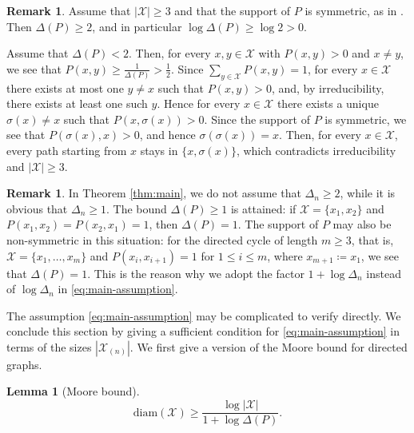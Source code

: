 \documentclass[a4paper, reqno, 11pt]{amsart}
\newtheorem{Lem}[Thm]{Lemma}
\theoremstyle{definition}
\newtheorem{Rem}[Thm]{Remark}
\begin{document}
\begin{Rem}\label{rem:delta-symmetric}
Assume that $|\mathcal{X}| \ge 3$ and that the support of $P$ is symmetric, as in \cite{Salez2024}.
Then $\Delta(P) \ge 2$, and in particular $\log \Delta(P) \ge \log 2 > 0$.


Assume that $\Delta(P) < 2$.
Then, for every $x, y \in \mathcal{X}$ with $P(x,y) > 0$ and $x \ne y$,
we see that $P(x,y) \ge \frac{1}{\Delta(P)} > \frac{1}{2}$.
Since $\sum_{y \in \mathcal{X}} P(x,y) = 1$,
for every $x \in \mathcal{X}$ there exists at most one $y \ne x$ such that $P(x,y) > 0$,
and, by irreducibility, there exists at least one such $y$.
Hence for every $x \in \mathcal{X}$ there exists a unique $\sigma(x) \ne x$ such that $P(x, \sigma(x)) > 0$.
Since the support of $P$ is symmetric, we see that $P(\sigma(x), x) > 0$, and hence $\sigma(\sigma(x)) = x$.
Then, for every $x \in \mathcal{X}$, every path starting from $x$ stays in $\{x, \sigma(x)\}$,
which contradicts irreducibility and $|\mathcal{X}| \ge 3$.
\end{Rem}

\begin{Rem}\label{rem:delta-one}
In Theorem \ref{thm:main}, we do not assume that $\Delta_n \ge 2$,
while it is obvious that $\Delta_n \ge 1$.
The bound $\Delta(P) \ge 1$ is attained:
if $\mathcal{X} = \{x_1, x_2\}$ and $P(x_1, x_2) = P(x_2, x_1) = 1$, then $\Delta(P) = 1$.
The support of $P$ may also be non-symmetric in this situation:
for the directed cycle of length $m \ge 3$, that is,
$\mathcal{X} = \{x_1, \dots, x_m\}$ and $P(x_i, x_{i+1}) = 1$ for $1 \le i \le m$, where $x_{m+1} \coloneqq x_1$,
we see that $\Delta(P) = 1$.
This is the reason why we adopt the factor $1 + \log \Delta_n$ instead of $\log \Delta_n$ in \eqref{eq:main-assumption}.
\end{Rem}

The assumption \eqref{eq:main-assumption} may be complicated to verify directly.
We conclude this section by giving a sufficient condition for \eqref{eq:main-assumption} in terms of the sizes $|\mathcal{X}_{(n)}|$.
We first give a version of the Moore bound for directed graphs.

\begin{Lem}[Moore bound]\label{lem:moore}
\[ \mathrm{diam}(\mathcal{X}) \ge \frac{\log |\mathcal{X}|}{1 + \log \Delta(P)}. \]
\end{Lem}
\end{document}
